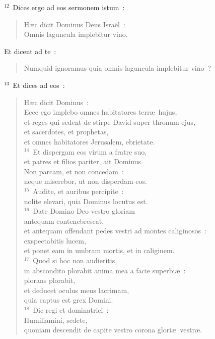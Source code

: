 ${}^{12}$~Dices ergo ad eos sermonem istum~: \begin{flushleft}\begin{verse}H\ae c dicit Dominus Deus Isra\"el~:\\ Omnis laguncula implebitur vino.\end{verse}\end{flushleft}

 Et dicent ad te~: \begin{flushleft}\begin{verse}Numquid ignoramus quia omnis laguncula implebitur vino~?\end{verse}\end{flushleft}


${}^{13}$~Et dices ad eos~: \begin{flushleft}\begin{verse}H\ae c dicit Dominus~:\\ Ecce ego implebo omnes habitatores terr\ae\ hujus,\\ et reges qui sedent de stirpe David super thronum ejus,\\ et sacerdotes, et prophetas,\\ et omnes habitatores Jerusalem, ebrietate.\\
${}^{14}$~Et dispergam eos virum a fratre suo,\\ et patres et filios pariter, ait Dominus.\\ Non parcam, et non concedam~:\\ neque miserebor, ut non disperdam eos.\\
${}^{15}$~Audite, et auribus percipite~:\\ nolite elevari, quia Dominus locutus est.\\
${}^{16}$~Date Domino Deo vestro gloriam\\ antequam contenebrescat,\\ et antequam offendant pedes vestri ad montes caliginosos~:\\ exspectabitis lucem,\\ et ponet eam in umbram mortis, et in caliginem.\\
${}^{17}$~Quod si hoc non audieritis,\\ in abscondito plorabit anima mea a facie superbi\ae~:\\ plorans plorabit,\\ et deducet oculus meus lacrimam,\\ quia captus est grex Domini.\\
${}^{18}$~Dic regi et dominatrici~:\\ Humiliamini, sedete,\\ quoniam descendit de capite vestro corona glori\ae\ vestr\ae .\\

\end{verse}
\end{flushleft}
